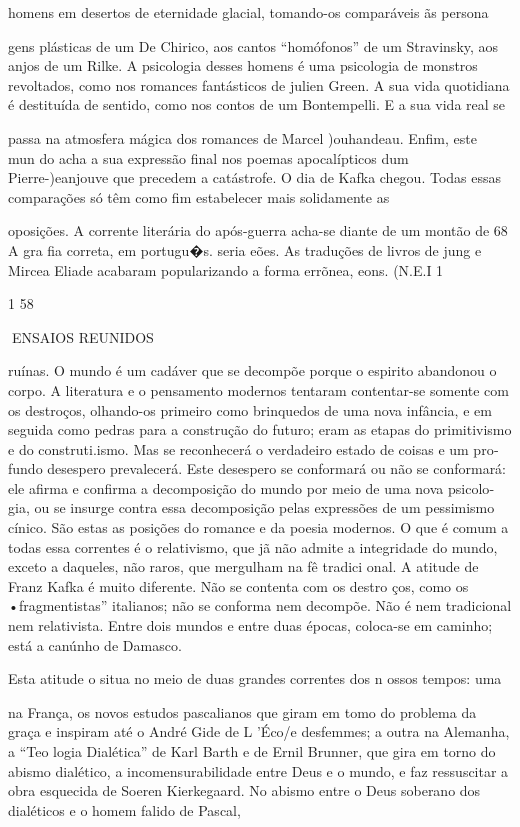 homens em desertos de eternidade glacial, tomando-os comparáveis ãs
persona­

gens plásticas de um De Chirico, aos cantos ``homófonos'' de um
Stravinsky, aos anjos de um Rilke. A psicologia desses homens é uma
psicologia de monstros revoltados, como nos romances fantásticos de
julien Green. A sua vida quotidiana é destituída de sentido, como nos
contos de um Bontempelli. E a sua vida real se

passa na atmosfera mágica dos romances de Marcel )ouhandeau. Enfim, este
mun­ do acha a sua expressão final nos poemas apocalípticos dum
Pierre-)eanjouve que precedem a catástrofe. O dia de Kafka chegou. Todas
essas comparações só têm como fim estabelecer mais solidamente as

oposições. A corrente literária do após-guerra acha-se diante de um
montão de 68 A gra fia correta, em portugu�s. seria eões. As traduções
de livros de jung e Mircea Eliade acabaram popularizando a forma
errõnea, eons. (N.E.I 1

1 58

ENSAIOS REUNIDOS

ruínas. O mundo é um cadáver que se decompõe porque o espirito abandonou
o corpo. A literatura e o pensamento modernos tentaram contentar-se
somente com os destroços, olhando-os primeiro como brinquedos de uma
nova infância, e em seguida como pedras para a construção do futuro;
eram as etapas do primitivismo e do construti.ismo. Mas se reconhecerá o
verdadeiro estado de coisas e um pro­ fundo desespero prevalecerá. Este
desespero se conformará ou não se conformará: ele afirma e confirma a
decomposição do mundo por meio de uma nova psicolo­ gia, ou se insurge
contra essa decomposição pelas expressões de um pessimismo cínico. São
estas as posições do romance e da poesia modernos. O que é comum a todas
essa correntes é o relativismo, que jã não admite a integridade do
mundo, exceto a daqueles, não raros, que mergulham na fê tradici­ onal.
A atitude de Franz Kafka é muito diferente. Não se contenta com os
destro­ ços, como os •fragmentistas'' italianos; não se conforma nem
decompõe. Não é nem tradicional nem relativista. Entre dois mundos e
entre duas épocas, coloca-se em caminho; está a canúnho de Damasco.

Esta atitude o situa no meio de duas grandes correntes dos n ossos
tempos: uma

na França, os novos estudos pascalianos que giram em tomo do problema da
graça e inspiram até o André Gide de L 'Éco/e desfemmes; a outra na
Alemanha, a ``Teo­ logia Dialética'' de Karl Barth e de Ernil Brunner,
que gira em torno do abismo dialético, a incomensurabilidade entre Deus
e o mundo, e faz ressuscitar a obra esquecida de Soeren Kierkegaard. No
abismo entre o Deus soberano dos dialéticos e o homem falido de Pascal,

